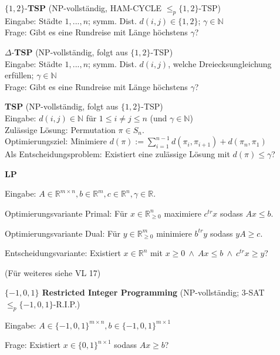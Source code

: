 \documentclass[a4paper,graphics,11pt]{article}
\begin{document}
\strut

$\{1,2\}$-\textbf{TSP} (\textsf{NP}-vollständig, HAM-CYCLE $\leq_p \{1,2\}$-TSP)
\\[5pt]
Eingabe: Städte $1,...,n$; symm. Dist. $d(i,j) \in \{1,2\}$; $\gamma \in \mathbb{N}$
\\[5pt]
Frage: Gibt es eine Rundreise mit Länge höchstens $\gamma$?

\strut

$\Delta$-\textbf{TSP} (\textsf{NP}-vollständig, folgt aus $\{1,2\}$-TSP)
\\[5pt]
Eingabe: Städte $1,...,n$; symm. Dist. $d(i,j)$, welche Dreiecksungleichung erfüllen; $\gamma \in \mathbb{N}$
\\[5pt]
Frage: Gibt es eine Rundreise mit Länge höchstens $\gamma$?

\strut

\textbf{TSP} (\textsf{NP}-vollständig, folgt aus $\{1,2\}$-TSP)
\\[5pt]
Eingabe: $d(i,j) \in \mathbb{N}$ für $1 \leq i \neq j \leq n$ (und $\gamma \in \mathbb{N}$)
\\[5pt]
Zulässige Lösung: Permutation $\pi \in S_n$.
\\[5pt]
Optimierungsziel: Minimiere $\displaystyle d(\pi) := \sum_{i=1}^{n-1} d(\pi_i,\pi_{i+1}) + d(\pi_n, \pi_1)$ 
\\[5pt]
Als Entscheidungsproblem: Existiert eine zulässige Lösung mit $d(\pi) \leq \gamma$?

\strut

\textbf{LP}

Eingabe: $A \in \mathbb{R}^{m \times n}, b \in \mathbb{R}^m, c \in \mathbb{R}^n, \gamma \in \mathbb{R}$.

Optimierungsvariante Primal: Für $x \in \mathbb{R}^n_{\geq 0}$ maximiere $c^{tr}x$ sodass $Ax \leq b$.

Optimierungsvariante Dual: Für $y \in \mathbb{R}^m_{\geq 0}$ minimiere $b^{tr}y$ sodass $yA \geq c$.

Entscheidungsvariante: Existiert $x \in \mathbb{R}^n$ mit $x \geq 0\ \land\ Ax \leq b\ \land\ c^{tr}x \geq y$?

(Für weiteres siehe VL 17)

\strut

\textbf{$\{-1, 0, 1\}$ Restricted Integer Programming} (\textsf{NP}-vollständig; 3-SAT $\leq_p \{-1,0,1\}$-R.I.P.)

Eingabe: $A \in \{-1,0,1\}^{m \times n}, b \in \{-1,0,1\}^{m\times 1}$

Frage: Existiert $x \in \{0, 1\}^{n \times 1}$ sodass $Ax \geq b$?
\end{document}
